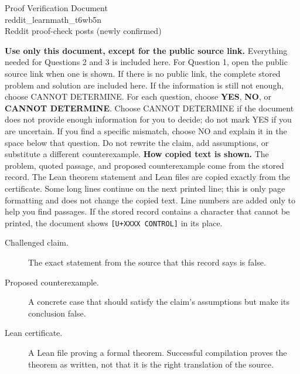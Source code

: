 \documentclass[11pt]{article}
\begin{document}
\begin{center}{\LARGE Proof Verification Document}\\[2pt]{\large reddit\_learnmath\_t6wb5n}\\[2pt]{\small Reddit proof-check posts (newly confirmed)}\end{center}
\begin{center}\end{center}
\textbf{Use only this document, except for the public source link.} Everything needed for Questions 2 and 3 is included here. For Question 1, open the public source link when one is shown. If there is no public link, the complete stored problem and solution are included here. If the information is still not enough, choose CANNOT DETERMINE.
For each question, choose \textbf{YES}, \textbf{NO}, or \textbf{CANNOT DETERMINE}. Choose CANNOT DETERMINE if the document does not provide enough information for you to decide; do not mark YES if you are uncertain. If you find a specific mismatch, choose NO and explain it in the space below that question. Do not rewrite the claim, add assumptions, or substitute a different counterexample.
\textbf{How copied text is shown.} The problem, quoted passage, and proposed counterexample come from the stored record. The Lean theorem statement and Lean files are copied exactly from the certificate. Some long lines continue on the next printed line; this is only page formatting and does not change the copied text. Line numbers are added only to help you find passages. If the stored record contains a character that cannot be printed, the document shows \texttt{[U+XXXX CONTROL]} in its place.
\begin{description}
\item[Challenged claim.] The exact statement from the source that this record says is false.
\item[Proposed counterexample.] A concrete case that should satisfy the claim's assumptions but make its conclusion false.
\item[Lean certificate.] A Lean file proving a formal theorem. Successful compilation proves the theorem as written, not that it is the right translation of the source.
\end{description}
\end{document}
